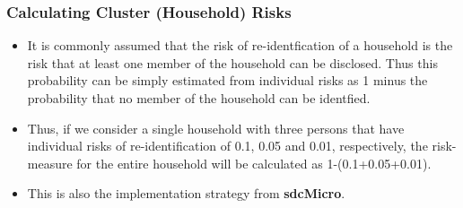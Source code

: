 \documentclass{beamer}
\begin{document}
	\begin{frame}
		\frametitle{Calculating Cluster (Household) Risks}
		\begin{itemize}			
			\item It is commonly assumed that the risk of re-identﬁcation of a household is the risk
			that at least one member of the household can be disclosed. Thus this probability
			can be simply estimated from individual risks as 1 minus the probability that no
			member of the household can be identﬁed. 
			\item Thus, if we consider a single household
			with three persons that have individual risks of re-identiﬁcation of 0.1, 0.05 and
			0.01, respectively, the risk-measure for the entire household will be calculated as
			1-(0.1+0.05+0.01). 
			\item This is also the implementation strategy from \textbf{sdcMicro}.
		\end{itemize}
	\end{frame}
\end{document}
